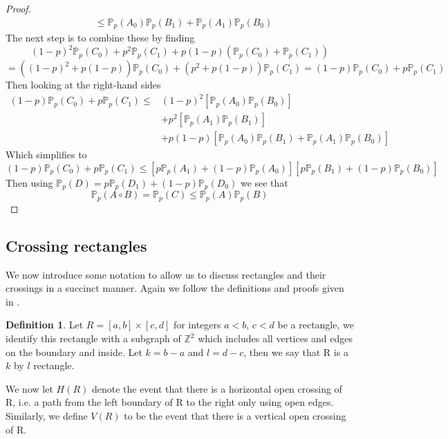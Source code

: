 \documentclass[a4paper,11pt]{article}
\newtheorem{corollary}[theorem]{Corollary}
\theoremstyle{definition}
\newtheorem{definition}[theorem]{Definition}
\newcommand{\ints}{\mathbb{Z}}
\newcommand{\prob}{\mathbb{P}_p}
\begin{document}
\begin{proof}
\begin{align*}
								&\leq \prob(A_0)\prob(B_1) + \prob(A_1)\prob(B_0)
	\end{align*}
	The next step is to combine these by finding 
	$$(1-p)^2\prob(C_0) + p^2\prob(C_1) + p(1-p)(\prob(C_0) + \prob(C_1))$$
	$$=((1-p)^2 + p(1-p))\prob(C_0) + (p^2 + p(1-p))\prob(C_1) = (1-p)\prob(C_0) + p\prob(C_1)$$
	Then looking at the right-hand sides
	\begin{align*}
		(1-p)\prob(C_0) + p\prob(C_1) \leq& (1-p)^2[\prob(A_0)\prob(B_0)]\\
		&+ p^2[\prob(A_1)\prob(B_1)]\\
		& +p(1-p)[\prob(A_0)\prob(B_1) + \prob(A_1)\prob(B_0)]
	\end{align*}
	Which simplifies to 
	$$(1-p)\prob(C_0) + p\prob(C_1) \leq [p\prob(A_1) + (1-p)\prob(A_0)][p\prob(B_1) + (1-p)\prob(B_0)]$$
	Then using $\prob(D) = p\prob(D_1) + (1-p)\prob(D_0)$ we see that
	$$\prob(A \circ B) = \prob(C) \leq \prob(A)\prob(B)$$

\end{proof}

\subsection{Crossing rectangles}

We now introduce some notation to allow us to discuss rectangles and their crossings in a succinct manner. Again we follow the definitions and proofs given in \cite{bollobas2006short}.
\begin{definition}
	Let $R = [a,b]\times[c, d]$ for integers $a<b$, $c<d$ be a rectangle, we identify this rectangle with a subgraph of $\ints^2$ which includes all vertices and edges on the boundary and inside. Let $k = b-a$ and $l = d-c$, then we say that R is a $k$ by $l$ rectangle.
	
	We now let $H(R)$ denote the event that there is a horizontal open crossing of R, i.e. a path from the left boundary of R to the right only using open edges. Similarly, we define $V(R)$ to be the event that there is a vertical open crossing of R. 
\end{definition}
\end{document}
